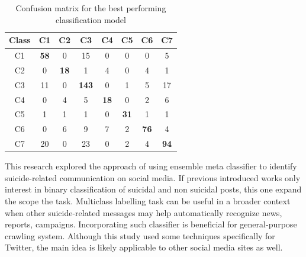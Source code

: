 \begin{table}
\center
\small
\noindent\begin{tabularx}{0.5\textwidth}{cccccccc}
\toprule
Class & C1 & C2 & C3 & C4 & C5 & C6 & C7  \\ 
\midrule
C1  & \textbf{58} & 0 & 15 & 0 & 0 & 0 & 5\\
C2 & 0 &  \textbf{18} &  1 &  4 &  0 &  4 &  1 \\
C3 & 11 &  0 &  \textbf{143} &  0 &  1 &  5 &  17  \\
C4 & 0  &  4 &  5 &  \textbf{18} &  0 &  2 &  6\\
C5 & 1 &  1 &  1 &  0 &  \textbf{31} &  1 &  1\\
C6 & 0 &  6 &  9 &  7 &  2 &  \textbf{76} &  4 \\
C7 & 20 &  0 &  23 &  0 &  2 &  4 &  \textbf{94}\\
\bottomrule
\end{tabularx}
\caption{Confusion matrix for the best performing classification model \cite{Burnap2015}}
\label{tab:confusion_matrix}
\end{table}
This research explored the approach of using ensemble meta classifier to identify suicide-related communication on social media. If previous introduced works only interest in binary classification of suicidal and non suicidal posts, this one expand the scope the task. Multiclass labelling task can be useful in a broader context when other suicide-related messages may help automatically recognize news, reports, campaigns. Incorporating such classifier is beneficial for general-purpose crawling system. Although this study used some techniques specifically for Twitter, the main idea is likely applicable to other social media sites as well. 
